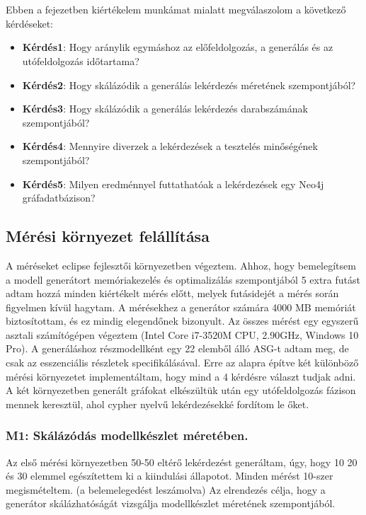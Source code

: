 \chapter{\evaluation}

Ebben a fejezetben kiértékelem munkámat mialatt megválaszolom a következő kérdéseket:

\begin{itemize}
	\item \textbf{Kérdés1}: Hogy aránylik egymáshoz az előfeldolgozás, a generálás és az utófeldolgozás időtartama?
	\item \textbf{Kérdés2}: Hogy skálázódik a generálás lekérdezés méretének szempontjából?
	\item \textbf{Kérdés3}: Hogy skálázódik a generálás lekérdezés darabszámának szempontjából?
	\item \textbf{Kérdés4}: Mennyire diverzek a lekérdezések a tesztelés minőségének szempontjából?
	\item \textbf{Kérdés5}: Milyen eredménnyel futtathatóak a lekérdezések egy Neo4j gráfadatbázison?
\end{itemize}

\section{Mérési környezet felállítása}


A méréseket eclipse fejlesztői környezetben végeztem. Ahhoz, hogy bemelegítsem a modell generátort memóriakezelés és optimalizálás szempontjából 5 extra futást adtam hozzá minden kiértékelt mérés előtt, melyek futásidejét a mérés során figyelmen kívül hagytam. A mérésekhez a generátor számára 4000 MB memóriát biztosítottam, és ez mindig elegendőnek bizonyult. Az összes mérést egy egyszerű asztali számítógépen végeztem (Intel Core i7-3520M CPU, 2.90GHz, Windows 10 Pro). A generáláshoz részmodellként egy 22 elemből álló ASG-t adtam meg, de csak az esszenciális részletek specifikálásával. Erre az alapra építve két különböző mérési környezetet implementáltam, hogy mind a 4 kérdésre választ tudjak adni. A két környezetben generált gráfokat elkészültük után egy utófeldolgozás fázison mennek keresztül, ahol cypher nyelvű lekérdezésekké fordítom le őket.

\subsection{M1: Skálázódás modellkészlet méretében.}

Az első mérési környezetben 50-50 eltérő lekérdezést generáltam, úgy, hogy 10 20 és 30 elemmel egészítettem ki a kiindulási állapotot. Minden mérést 10-szer megismételtem. (a belemelegedést leszámolva) Az elrendezés célja, hogy a generátor skálázhatóságát vizsgálja modellkészlet méretének szempontjából.

